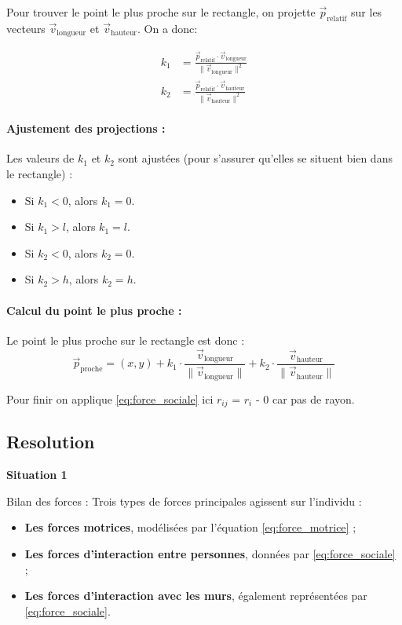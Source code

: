 \documentclass[a4paper,12pt]{article}
\begin{document}
Pour trouver le point le plus proche sur le rectangle, on projette $\vec{p}_{\text{relatif}}$ sur les vecteurs $\vec{v}_{\text{longueur}}$ et $\vec{v}_{\text{hauteur}}$. On a donc:

\begin{align*}
k_1 &= \frac{\vec{p}_{\text{relatif}} \cdot \vec{v}_{\text{longueur}}}{\|\vec{v}_{\text{longueur}}\|^2} \\
k_2 &= \frac{\vec{p}_{\text{relatif}} \cdot \vec{v}_{\text{hauteur}}}{\|\vec{v}_{\text{hauteur}}\|^2}
\end{align*}

\paragraph{Ajustement des projections :}

Les valeurs de $k_1$ et $k_2$ sont ajustées (pour s'assurer qu'elles se situent bien dans le rectangle) :
\begin{itemize}
    \item Si $k_1 < 0$, alors $k_1 = 0$.
    \item Si $k_1 > l$, alors $k_1 = l$.
    \item Si $k_2 < 0$, alors $k_2 = 0$.
    \item Si $k_2 > h$, alors $k_2 = h$.
\end{itemize}

\paragraph{Calcul du point le plus proche :}

Le point le plus proche sur le rectangle est donc :
\[
\vec{p}_{\text{proche}} = (x, y) + k_1 \cdot \frac{\vec{v}_{\text{longueur}}}{\|\vec{v}_{\text{longueur}}\|} + k_2 \cdot \frac{\vec{v}_{\text{hauteur}}}{\|\vec{v}_{\text{hauteur}}\|}
\]

Pour finir on applique \eqref{eq:force_sociale} ici $r_{ij}$ = $r_i$ - 0 car pas de rayon.

\subsection{Resolution}

\textbf{Situation 1}

Bilan des forces :
Trois types de forces principales agissent sur l’individu :
\begin{itemize}
\item \textbf{Les forces motrices}, modélisées par l’équation \eqref{eq:force_motrice} ;
\item \textbf{Les forces d’interaction entre personnes}, données par \eqref{eq:force_sociale} ;
\item \textbf{Les forces d’interaction avec les murs}, également représentées par \eqref{eq:force_sociale}.
\end{itemize}
\end{document}
